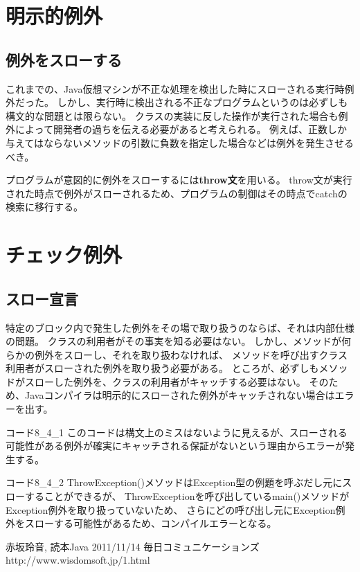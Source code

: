 \documentclass[12pt,a4j,twoside]{jsbook}
\begin{document}
\section{明示的例外}
\subsection{例外をスローする}
これまでの、Java仮想マシンが不正な処理を検出した時にスローされる実行時例外だった。
しかし、実行時に検出される不正なプログラムというのは必ずしも構文的な問題とは限らない。
クラスの実装に反した操作が実行された場合も例外によって開発者の過ちを伝える必要があると考えられる。
例えば、正数しか与えてはならないメソッドの引数に負数を指定した場合などは例外を発生させるべき。

プログラムが意図的に例外をスローするには\textbf{throw文}を用いる。
throw文が実行された時点で例外がスローされるため、プログラムの制御はその時点でcatchの検索に移行する。

\section{チェック例外}
\subsection{スロー宣言}
特定のブロック内で発生した例外をその場で取り扱うのならば、それは内部仕様の問題。
クラスの利用者がその事実を知る必要はない。
しかし、メソッドが何らかの例外をスローし、それを取り扱わなければ、
メソッドを呼び出すクラス利用者がスローされた例外を取り扱う必要がある。
ところが、必ずしもメソッドがスローした例外を、クラスの利用者がキャッチする必要はない。
そのため、Javaコンパイラは明示的にスローされた例外がキャッチされない場合はエラーを出す。

コード8\_4\_1
このコードは構文上のミスはないように見えるが、スローされる可能性がある例外が確実にキャッチされる保証がないという理由からエラーが発生する。


コード8\_4\_2
ThrowException()メソッドはException型の例題を呼ぶだし元にスローすることができるが、
ThrowExceptionを呼び出しているmain()メソッドがException例外を取り扱っていないため、
さらにどの呼び出し元にException例外をスローする可能性があるため、コンパイルエラーとなる。


\begin{thebibliography}{9}



赤坂玲音,
読本Java 2011/11/14 毎日コミュニケーションズ
http://www.wisdomsoft.jp/1.html
\end{thebibliography}
\end{document}
